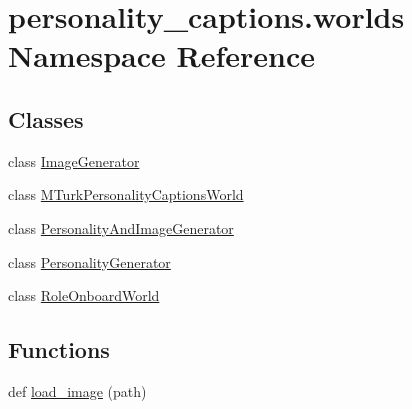 \hypertarget{namespacepersonality__captions_1_1worlds}{}\section{personality\+\_\+captions.\+worlds Namespace Reference}
\label{namespacepersonality__captions_1_1worlds}
\subsection*{Classes}
\begin{DoxyCompactItemize}
\item 
class \hyperlink{classpersonality__captions_1_1worlds_1_1ImageGenerator}{Image\+Generator}
\item 
class \hyperlink{classpersonality__captions_1_1worlds_1_1MTurkPersonalityCaptionsWorld}{M\+Turk\+Personality\+Captions\+World}
\item 
class \hyperlink{classpersonality__captions_1_1worlds_1_1PersonalityAndImageGenerator}{Personality\+And\+Image\+Generator}
\item 
class \hyperlink{classpersonality__captions_1_1worlds_1_1PersonalityGenerator}{Personality\+Generator}
\item 
class \hyperlink{classpersonality__captions_1_1worlds_1_1RoleOnboardWorld}{Role\+Onboard\+World}
\end{DoxyCompactItemize}
\subsection*{Functions}
\begin{DoxyCompactItemize}
\item 
def \hyperlink{namespacepersonality__captions_1_1worlds_a2863737d97a8e8c5a1ebe9029d0d2293}{load\+\_\+image} (path)
\end{DoxyCompactItemize}
